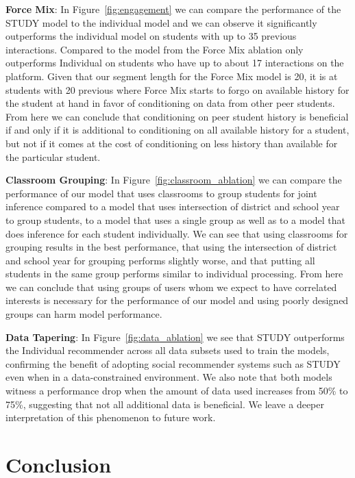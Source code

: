 \documentclass{article}
\begin{document}
\textbf{Force Mix}: In Figure~\ref{fig:engagement} we can compare the performance of the STUDY model to the individual model and we can observe it significantly outperforms the individual model on students with up to 35 previous interactions. Compared to the model from the Force Mix ablation only outperforms Individual on students who have up to about 17 interactions on the platform. Given that our segment length for the Force Mix model is 20, it is at students with 20 previous where Force Mix starts to forgo on available history for the student at hand in favor of conditioning on data from other peer students. From here we can conclude that conditioning on peer student history is beneficial if and only if it is additional to conditioning on all available history for a student, but not if it comes at the cost of conditioning on less history than available for the particular student.

\textbf{Classroom Grouping}: In Figure~\ref{fig:classroom_ablation} we can compare the performance of our model that uses classrooms to group students for joint inference compared to a model that uses intersection of district and school year to group students, to a model that uses a single group as well as to a model that does inference for each student individually. We can see that using classrooms for grouping results in the best performance, that using the intersection of district and school year for grouping performs slightly worse, and that putting all students in the same group performs similar to individual processing. From here we can conclude that using groups of users whom we expect to have correlated interests is necessary for the performance of our model and using poorly designed groups can harm model performance.

\textbf{Data Tapering}: In Figure~\ref{fig:data_ablation} we see that STUDY outperforms the Individual recommender across all data subsets used to train the models, confirming the benefit of adopting social recommender systems such as STUDY even when in a data-constrained environment. We also note that both models witness a performance drop when the amount of data used increases from 50\% to 75\%, suggesting that not all additional data is beneficial. We leave a deeper interpretation of this phenomenon to future work.   

\section{Conclusion}
\end{document}
